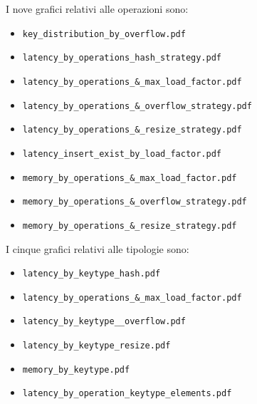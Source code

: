 I nove grafici relativi alle operazioni sono:
\begin{itemize}
    \item \texttt{key\_distribution\_by\_overflow.pdf}
    \item \texttt{latency\_by\_operations\_hash\_strategy.pdf}
    \item \texttt{latency\_by\_operations\_\&\_max\_load\_factor.pdf}
    \item \texttt{latency\_by\_operations\_\&\_overflow\_strategy.pdf}
    \item \texttt{latency\_by\_operations\_\&\_resize\_strategy.pdf}
    \item \texttt{latency\_insert\_exist\_by\_load\_factor.pdf}
    \item \texttt{memory\_by\_operations\_\&\_max\_load\_factor.pdf}
    \item \texttt{memory\_by\_operations\_\&\_overflow\_strategy.pdf}
    \item \texttt{memory\_by\_operations\_\&\_resize\_strategy.pdf}
\end{itemize}

I cinque grafici relativi alle tipologie sono:
\begin{itemize}
    \item \texttt{latency\_by\_keytype\_hash.pdf}
    \item \texttt{latency\_by\_operations\_\&\_max\_load\_factor.pdf}
    \item \texttt{latency\_by\_keytype\_\_overflow.pdf}
    \item \texttt{latency\_by\_keytype\_resize.pdf}
    \item \texttt{memory\_by\_keytype.pdf}
    \item \texttt{latency\_by\_operation\_keytype\_elements.pdf}
\end{itemize}

